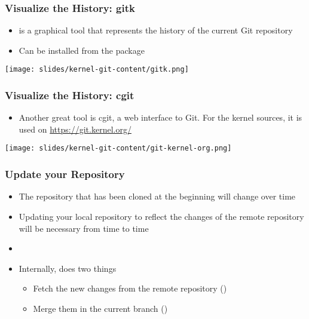 \begin{frame}
  \frametitle{Visualize the History: gitk}
  \begin{itemize}
  \item {} is a graphical tool that represents the history of
    the current Git repository
  \item Can be installed from the  package
  \end{itemize}
  \begin{center}
    \texttt{[image: slides/kernel-git-content/gitk.png]}
  \end{center}
\end{frame}

\begin{frame}
  \frametitle{Visualize the History: cgit}
  \begin{itemize}
  \item Another great tool is cgit, a web interface to Git. For the
    kernel sources, it is used on \url{https://git.kernel.org/}
  \end{itemize}
  \begin{center}
    \texttt{[image: slides/kernel-git-content/git-kernel-org.png]}
  \end{center}
\end{frame}

\begin{frame}
  \frametitle{Update your Repository}
  \begin{itemize}
  \item The repository that has been cloned at the beginning will
    change over time
  \item Updating your local repository to reflect the changes of the
    remote repository will be necessary from time to time
  \item {}
  \item Internally, does two things
    \begin{itemize}
    \item Fetch the new changes from the remote repository
      ()
    \item Merge them in the current branch ()
    \end{itemize}
  \end{itemize}
\end{frame}

